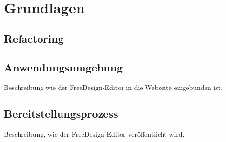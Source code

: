 \chapter{Grundlagen}


\section{Refactoring}



\section{Anwendungsumgebung}
Beschreibung wie der FreeDesign-Editor in die Webseite eingebunden ist.

\section{Bereitstellungsprozess}
Beschreibung, wie der FreeDesign-Editor veröffentlicht wird.



